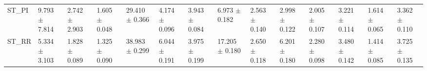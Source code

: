 \begin{tabular}{llllllllllllll}
ST_PI     &   9.793 $ \pm $ 7.814 &  2.742 $ \pm $ 2.903 &  1.605 $ \pm $ 0.048 &  29.410 $ \pm $ 0.366 &   4.174 $ \pm $ 0.096 &   3.943 $ \pm $ 0.084 &   6.973 $ \pm $ 0.182 &   2.563 $ \pm $ 0.140 &   2.998 $ \pm $ 0.122 &  2.005 $ \pm $ 0.107 &   3.221 $ \pm $ 0.114 &  1.614 $ \pm $ 0.065 &   3.362 $ \pm $ 0.110 \\
ST_RR     &   5.334 $ \pm $ 3.103 &  1.828 $ \pm $ 0.089 &  1.325 $ \pm $ 0.090 &  38.983 $ \pm $ 0.299 &   6.044 $ \pm $ 0.191 &   3.975 $ \pm $ 0.199 &  17.205 $ \pm $ 0.180 &   2.650 $ \pm $ 0.118 &   6.201 $ \pm $ 0.180 &  2.280 $ \pm $ 0.098 &   3.480 $ \pm $ 0.142 &  1.414 $ \pm $ 0.085 &   3.725 $ \pm $ 0.135 \\
\bottomrule
\end{tabular}
